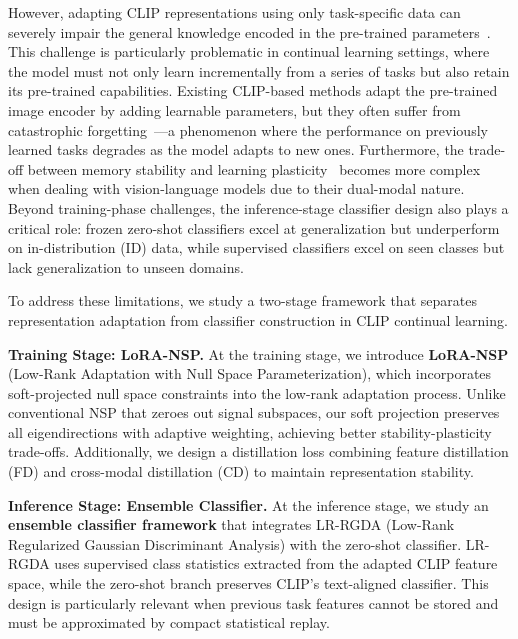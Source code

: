 \documentclass{article}
\begin{document}
However, adapting CLIP representations using only task-specific data can severely impair the general knowledge encoded in the pre-trained parameters~\cite{zheng2023zscl}. This challenge is particularly problematic in continual learning settings, where the model must not only learn incrementally from a series of tasks but also retain its pre-trained capabilities. Existing CLIP-based methods adapt the pre-trained image encoder by adding learnable parameters, but they often suffer from catastrophic forgetting~\cite{french1999catastrophic}---a phenomenon where the performance on previously learned tasks degrades as the model adapts to new ones. Furthermore, the trade-off between memory stability and learning plasticity~\cite{mermillod2013stability} becomes more complex when dealing with vision-language models due to their dual-modal nature. Beyond training-phase challenges, the inference-stage classifier design also plays a critical role: frozen zero-shot classifiers excel at generalization but underperform on in-distribution (ID) data, while supervised classifiers excel on seen classes but lack generalization to unseen domains.

To address these limitations, we study a two-stage framework that separates representation adaptation from classifier construction in CLIP continual learning.

\textbf{Training Stage: LoRA-NSP.} At the training stage, we introduce \textbf{LoRA-NSP} (Low-Rank Adaptation with Null Space Parameterization), which incorporates soft-projected null space constraints into the low-rank adaptation process. Unlike conventional NSP that zeroes out signal subspaces, our soft projection preserves all eigendirections with adaptive weighting, achieving better stability-plasticity trade-offs. Additionally, we design a distillation loss combining feature distillation (FD) and cross-modal distillation (CD) to maintain representation stability.

\textbf{Inference Stage: Ensemble Classifier.} At the inference stage, we study an \textbf{ensemble classifier framework} that integrates LR-RGDA (Low-Rank Regularized Gaussian Discriminant Analysis) with the zero-shot classifier. LR-RGDA uses supervised class statistics extracted from the adapted CLIP feature space, while the zero-shot branch preserves CLIP's text-aligned classifier. This design is particularly relevant when previous task features cannot be stored and must be approximated by compact statistical replay.
\end{document}
